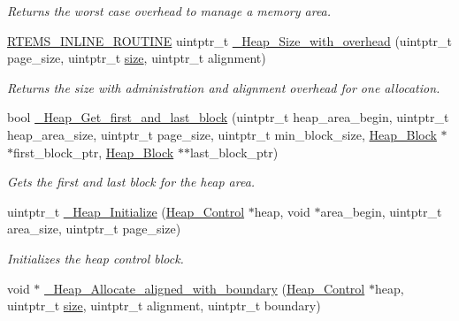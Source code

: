 \begin{DoxyCompactItemize}
\begin{DoxyCompactList}\small\item\em Returns the worst case overhead to manage a memory area. \end{DoxyCompactList}\item 
\mbox{\hyperlink{group__RTEMSScoreBaseDefs_gac216239df231d5dbd15e3520b0b9313f}{R\+T\+E\+M\+S\+\_\+\+I\+N\+L\+I\+N\+E\+\_\+\+R\+O\+U\+T\+I\+NE}} uintptr\+\_\+t \mbox{\hyperlink{group__RTEMSScoreHeap_ga00d53e87789012f59ec95f97911f3f8b}{\+\_\+\+Heap\+\_\+\+Size\+\_\+with\+\_\+overhead}} (uintptr\+\_\+t page\+\_\+size, uintptr\+\_\+t \mbox{\hyperlink{sun4u_2tte_8h_a245260f6f74972558f61b85227df5aae}{size}}, uintptr\+\_\+t alignment)
\begin{DoxyCompactList}\small\item\em Returns the size with administration and alignment overhead for one allocation. \end{DoxyCompactList}\item 
bool \mbox{\hyperlink{group__RTEMSScoreHeap_ga31ce1fc13ec844eaccf67486e290324b}{\+\_\+\+Heap\+\_\+\+Get\+\_\+first\+\_\+and\+\_\+last\+\_\+block}} (uintptr\+\_\+t heap\+\_\+area\+\_\+begin, uintptr\+\_\+t heap\+\_\+area\+\_\+size, uintptr\+\_\+t page\+\_\+size, uintptr\+\_\+t min\+\_\+block\+\_\+size, \mbox{\hyperlink{structHeap__Block}{Heap\+\_\+\+Block}} $\ast$$\ast$first\+\_\+block\+\_\+ptr, \mbox{\hyperlink{structHeap__Block}{Heap\+\_\+\+Block}} $\ast$$\ast$last\+\_\+block\+\_\+ptr)
\begin{DoxyCompactList}\small\item\em Gets the first and last block for the heap area. \end{DoxyCompactList}\item 
uintptr\+\_\+t \mbox{\hyperlink{group__RTEMSScoreHeap_gac5974c7ccf84c152ba6c8e17bea3ca5f}{\+\_\+\+Heap\+\_\+\+Initialize}} (\mbox{\hyperlink{structHeap__Control}{Heap\+\_\+\+Control}} $\ast$heap, void $\ast$area\+\_\+begin, uintptr\+\_\+t area\+\_\+size, uintptr\+\_\+t page\+\_\+size)
\begin{DoxyCompactList}\small\item\em Initializes the heap control block. \end{DoxyCompactList}\item 
void $\ast$ \mbox{\hyperlink{group__RTEMSScoreHeap_ga15167f1ad5eb93d85f15adb5e5524ff5}{\+\_\+\+Heap\+\_\+\+Allocate\+\_\+aligned\+\_\+with\+\_\+boundary}} (\mbox{\hyperlink{structHeap__Control}{Heap\+\_\+\+Control}} $\ast$heap, uintptr\+\_\+t \mbox{\hyperlink{sun4u_2tte_8h_a245260f6f74972558f61b85227df5aae}{size}}, uintptr\+\_\+t alignment, uintptr\+\_\+t boundary)

\end{DoxyCompactItemize}
